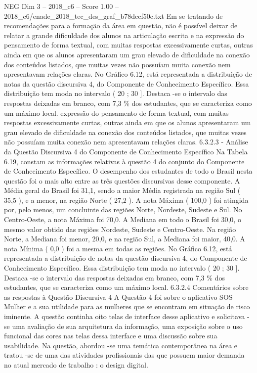 \begin{textsample}{NEG Dim 3 – 2018\_c6 – Score 1.00 – 2018\_c6/enade\_2018\_tec\_des\_graf\_b78dccf50c.txt}
Em se tratando de recomendações para a formação da área em questão, não é possível deixar de relatar a grande dificuldade dos alunos na articulação escrita e na expressão do pensamento de forma textual, com muitas respostas excessivamente curtas, outras ainda em que os alunos apresentaram um grau elevado de dificuldade na conexão dos conteúdos listados, que muitas vezes não possuíam muita conexão nem apresentavam relações claras.
No Gráfico 6.12, está representada a distribuição de notas da questão discursiva 4, do Componente de Conhecimento Específico.
Essa distribuição tem moda no intervalo ( 20 ; 30 ].
Destaca -se o intervalo das respostas deixadas em branco, com 7,3 \% dos estudantes, que se caracteriza como um máximo local. expressão do pensamento de forma textual, com muitas respostas excessivamente curtas, outras ainda em que os alunos apresentaram um grau elevado de dificuldade na conexão dos conteúdos listados, que muitas vezes não possuíam muita conexão nem apresentavam relações claras. 6.3.2.3 - Análise da Questão Discursiva 4 do Componente de Conhecimento Específico Na Tabela 6.19, constam as informações relativas à questão 4 do conjunto do Componente de Conhecimento Específico.
O desempenho dos estudantes de todo o Brasil nesta questão foi o mais alto entre as três questões discursivas desse componente.
A Média geral do Brasil foi 31,1, sendo a maior Média registrada na região Sul ( 35,5 ), e a menor, na região Norte ( 27,2 ).
A nota Máxima ( 100,0 ) foi atingida por, pelo menos, um concluinte das regiões Norte, Nordeste, Sudeste e Sul.
No Centro-Oeste, a nota Máxima foi 70,0.
A Mediana em todo o Brasil foi 30,0, o mesmo valor obtido das regiões Nordeste, Sudeste e Centro-Oeste.
Na região Norte, a Mediana foi menor, 20,0, e na região Sul, a Mediana foi maior, 40,0.
A nota Mínima ( 0,0 ) foi a mesma em todas as regiões.
No Gráfico 6.12, está representada a distribuição de notas da questão discursiva 4, do Componente de Conhecimento Específico.
Essa distribuição tem moda no intervalo ( 20 ; 30 ].
Destaca -se o intervalo das respostas deixadas em branco, com 7,3 \% dos estudantes, que se caracteriza como um máximo local. 6.3.2.4 Comentários sobre as respostas à Questão Discursiva 4 A Questão 4 foi sobre o aplicativo SOS Mulher e a sua utilidade para as mulheres que se encontram em situação de risco iminente.
A questão continha oito telas de interface desse aplicativo e solicitava -se uma avaliação de sua arquitetura da informação, uma exposição sobre o uso funcional das cores nas telas dessa interface e uma discussão sobre sua usabilidade.
Na questão, abordou -se uma temática contemporânea na área e tratou -se de uma das atividades profissionais das que possuem maior demanda no atual mercado de trabalho : o design digital.

\end{textsample}
